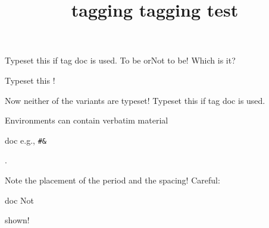 \documentclass{article}
\title{tagging tagging test}
\begin{document}
   {Typeset this if tag doc is used.}
  {To be or}{Not to be!}  Which is it?   \par
{}
Typeset this !     \par
{} 
Now neither of the variants are typeset!
   {Typeset this if tag doc is used.}

Environments can contain verbatim material
\begin{taggedblock}{doc}
e.g.,
\verb=#&=\end{taggedblock}
.

Note the placement of the period and the spacing!
Careful:
\begin{untaggedblock}{doc}
Not
\end{untaggedblock}
shown!
\end{document}
